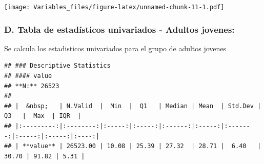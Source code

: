 \documentclass[
]{article}
\newenvironment{Shaded}{\begin{snugshade}}{\end{snugshade}}
\newcommand{\AttributeTok}[1]{\textcolor[rgb]{0.13,0.29,0.53}{#1}}
\newcommand{\ConstantTok}[1]{\textcolor[rgb]{0.56,0.35,0.01}{#1}}
\newcommand{\FunctionTok}[1]{\textcolor[rgb]{0.13,0.29,0.53}{\textbf{#1}}}
\newcommand{\NormalTok}[1]{#1}
\newcommand{\SpecialCharTok}[1]{\textcolor[rgb]{0.81,0.36,0.00}{\textbf{#1}}}
\newcommand{\StringTok}[1]{\textcolor[rgb]{0.31,0.60,0.02}{#1}}
\begin{document}
\texttt{[image: Variables\_files/figure-latex/unnamed-chunk-11-1.pdf]}

\hypertarget{d.-tabla-de-estaduxedsticos-univariados---adultos-jovenes}{%
\subsubsection{\texorpdfstring{\textbf{D. Tabla de estadísticos
univariados - Adultos
jovenes:}}{D. Tabla de estadísticos univariados - Adultos jovenes:}}\label{d.-tabla-de-estaduxedsticos-univariados---adultos-jovenes}}

Se calcula los estadisticos univariados para el grupo de adultos jovenes

\begin{Shaded}
\end{Shaded}

\begin{verbatim}
## ### Descriptive Statistics  
## #### value  
## **N:** 26523  
## 
## |  &nbsp;   | N.Valid  |  Min  |  Q1   | Median | Mean  | Std.Dev |  Q3   |  Max  | IQR  |
## |:---------:|:--------:|:-----:|:-----:|:------:|:-----:|:-------:|:-----:|:-----:|:----:|
## | **value** | 26523.00 | 10.08 | 25.39 | 27.32  | 28.71 |  6.40   | 30.70 | 91.82 | 5.31 |
\end{verbatim}

\begin{Shaded}
\end{Shaded}
\end{document}
